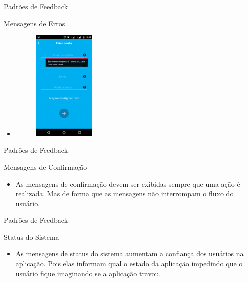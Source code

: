 \begin{frame}{Padrões de Feedback}
\begin{block}{Mensagens de Erros}
  \begin{itemize}
    \item<1-> \begin{figure}
    \includegraphics[width=3cm]{figuras/error/error5}
    \end{figure}
  \end{itemize}
\end{block}
\end{frame}

\begin{frame}{Padrões de Feedback}
\begin{block}{Mensagens de Confirmação}
  \begin{itemize}
    \item<1-> As mensagens de confirmação devem ser exibidas sempre que uma ação é realizada. Mas de forma que as mensagens não interrompam o fluxo do usuário.
  \end{itemize}
\end{block}
\end{frame}

\begin{frame}{Padrões de Feedback}
\begin{block}{Status do Sistema}
  \begin{itemize}
    \item<1-> As mensagens de status do sistema aumentam a confiança dos usuários na aplicação. Pois elas informam qual o estado da aplicação impedindo que o usuário fique imaginando se a aplicação travou.
  \end{itemize}
\end{block}
\end{frame}

